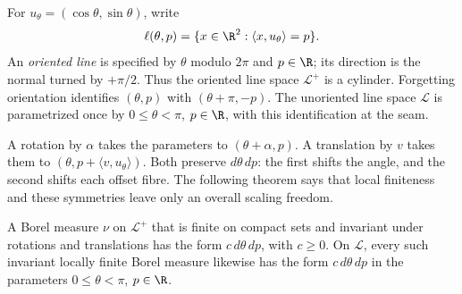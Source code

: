 For $u_\theta=(\cos\theta,\sin\theta)$, write
\[
\ell(\theta,p)=\{x\in\R^2:\langle x,u_\theta\rangle=p\}.
\]
An \emph{oriented line} is specified by $\theta$ modulo $2\pi$ and $p\in\R$; its direction is the normal turned by $+\pi/2$. Thus the oriented line space $\mathcal L^+$ is a cylinder. Forgetting orientation identifies $(\theta,p)$ with $(\theta+\pi,-p)$. The unoriented line space $\mathcal L$ is parametrized once by $0\le\theta<\pi$, $p\in\R$, with this identification at the seam.

A rotation by $\alpha$ takes the parameters to $(\theta+\alpha,p)$. A translation by $v$ takes them to $(\theta,p+\langle v,u_\theta\rangle)$. Both preserve $d\theta\,dp$: the first shifts the angle, and the second shifts each offset fibre. The following theorem says that local finiteness and these symmetries leave only an overall scaling freedom.

\begin{theorem}\label{thm:linesunique}
A Borel measure $\nu$ on $\mathcal L^+$ that is finite on compact sets and invariant under rotations and translations has the form $c\,d\theta\,dp$, with $c\ge0$. On $\mathcal L$, every such invariant locally finite Borel measure likewise has the form $c\,d\theta\,dp$ in the parameters $0\le\theta<\pi$, $p\in\R$.
\end{theorem}


